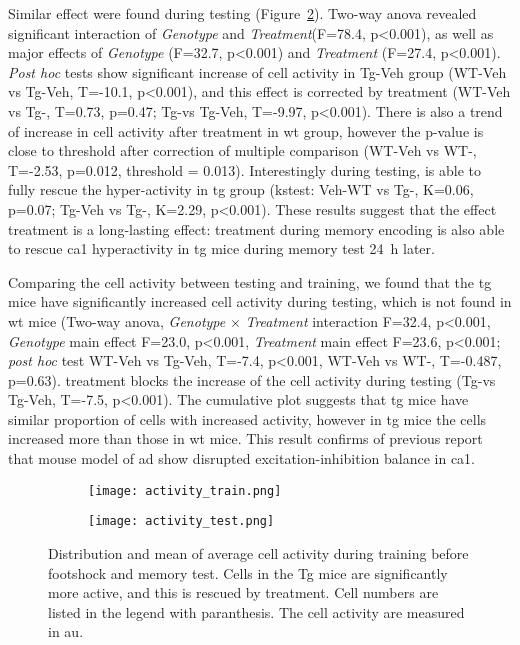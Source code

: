 Similar effect were found during testing (Figure~\ref{f.ad.acttest}). Two-way \gls{anova} revealed significant interaction of \textit{Genotype} and \textit{Treatment}(F=78.4, p<0.001), as well as major effects of \textit{Genotype} (F=32.7, p<0.001) and \textit{Treatment} (F=27.4, p<0.001). \textit{Post hoc} tests show significant increase of cell activity in Tg-Veh group (WT-Veh vs Tg-Veh, T=-10.1, p<0.001), and this effect is corrected by \tglu treatment (WT-Veh vs Tg-\glu, T=0.73, p=0.47; Tg-\glu vs Tg-Veh, T=-9.97, p<0.001). There is also a trend of increase in cell activity after \tglu treatment in \gls{wt} group, however the p-value is close to threshold after correction of multiple comparison (WT-Veh vs WT-\glu, T=-2.53, p=0.012, threshold = 0.013). Interestingly during testing, \tglu is able to fully rescue the hyper-activity in \gls{tg} group (\gls{kstest}: Veh-WT vs Tg-\glu, K=0.06, p=0.07; Tg-Veh vs Tg-\glu, K=2.29, p<0.001). These results suggest that the effect \tglu treatment is a long-lasting effect: treatment during memory encoding is also able to rescue \gls{ca1} hyperactivity in \gls{tg} mice during memory test \SI{24}{\hour} later.

Comparing the cell activity between testing and training, we found that the \gls{tg} mice have significantly increased cell activity during testing,  which is not found in \gls{wt} mice (Two-way \gls{anova}, \textit{Genotype} $\times$ \textit{Treatment} interaction F=32.4, p<0.001, \textit{Genotype} main effect F=23.0, p<0.001, \textit{Treatment} main effect F=23.6, p<0.001; \textit{post hoc} test WT-Veh vs Tg-Veh, T=-7.4, p<0.001, WT-Veh vs WT-\glu, T=-0.487, p=0.63). \tglu treatment blocks the increase of the cell activity during testing (Tg-\glu vs Tg-Veh, T=-7.5, p<0.001). The cumulative plot suggests that \gls{tg} mice have similar proportion of cells with increased activity, however in \gls{tg} mice the cells increased more than those in \gls{wt} mice. This result confirms of previous report that mouse model of \gls{ad} show disrupted excitation-inhibition balance in \gls{ca1}. 

\begin{figure}[h]
    \begin{subfigure}[h]{\textwidth}
        \texttt{[image: activity\_train.png]}
        \caption{\label{f.ad.acttrain}}
    \end{subfigure}
    \begin{subfigure}[h]{\textwidth}
        \texttt{[image: activity\_test.png]}
        \caption{\label{f.ad.acttest}}
    \end{subfigure}
    \caption{Distribution and mean of average cell activity during  training before footshock and  memory test. Cells in the Tg mice are significantly more active, and this is rescued by \tglu treatment. Cell numbers are listed in the legend with paranthesis. The cell activity are measured in \gls{au}. \label{f.ad.activity}}
\end{figure}

